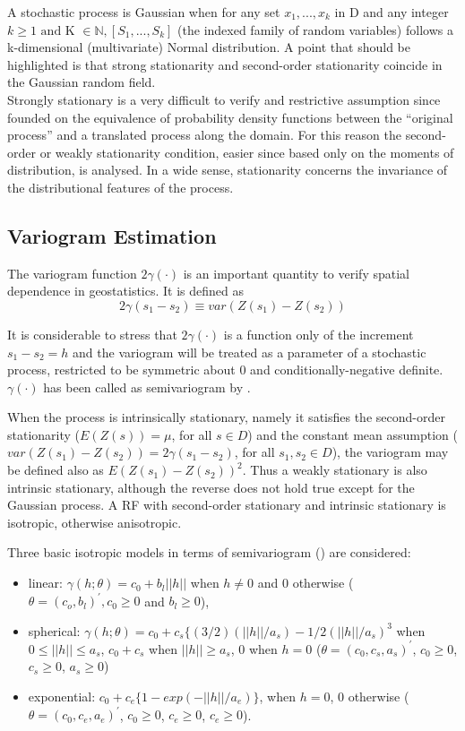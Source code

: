 \documentclass[
  12pt]{article}
\providecommand{\tightlist}{%
  \setlength{\itemsep}{0pt}\setlength{\parskip}{0pt}}\usepackage{longtable,booktabs,array}
\begin{document}
A stochastic process is Gaussian when for any set \(x_1,..., x_k\) in D
and any integer
\(k \geq 1 \text{ and K } \in \mathbb{N},[S_1,..., S_k ]\) (the indexed
family of random variables) follows a k-dimensional (multivariate)
Normal distribution. A point that should be highlighted is that strong
stationarity and second-order stationarity coincide in the Gaussian
random field.\\
Strongly stationary is a very difficult to verify and restrictive
assumption since founded on the equivalence of probability density
functions between the ``original process'' and a translated process
along the domain. For this reason the second-order or weakly
stationarity condition, easier since based only on the moments of
distribution, is analysed. In a wide sense, stationarity concerns the
invariance of the distributional features of the process.

\subsection{Variogram Estimation}\label{variogram-estimation}

The variogram function \(2\gamma(\cdot)\) is an important quantity to
verify spatial dependence in geostatistics. It is defined as\\
\[2\gamma(s_1-s_2)\equiv var(Z(s_1)-Z(s_2))\]

It is considerable to stress that \(2\gamma(\cdot)\) is a function only
of the increment \(s_1 - s_2=h\) and the variogram will be treated as a
parameter of a stochastic process, restricted to be symmetric about 0
and conditionally-negative definite. \(\gamma(\cdot)\) has been called
as semivariogram by \citet{mat:1962}.

When the process is intrinsically stationary, namely it satisfies the
second-order stationarity (\(E(Z(s))=\mu\), for all \(s\in D\)) and the
constant mean assumption (\(var(Z(s_1)-Z(s_2))=2\gamma(s_1-s_2)\), for
all \(s_1,s_2 \in D\)), the variogram may be defined also as
\(E(Z(s_1)-Z(s_2))^2\). Thus a weakly stationary is also intrinsic
stationary, although the reverse does not hold true except for the
Gaussian process. A RF with second-order stationary and intrinsic
stationary is isotropic, otherwise anisotropic.

Three basic isotropic models in terms of semivariogram (\citet{ag:1978})
are considered:

\begin{itemize}
\tightlist
\item
  linear: \(\gamma(h;\theta)=c_0+b_l||h||\) when \(h \neq 0\) and \(0\)
  otherwise (\(\theta=(c_o,b_l)^{\prime}, c_0 \geq 0\) and
  \(b_l \geq 0\)),
\item
  spherical:
  \(\gamma(h;\theta)=c_0+c_s\{(3/2)(||h||/a_{s})-1/2(||h||/a_{s})^3\)
  when \(0\leq ||h|| \leq a_s\), \(c_0+c_s\) when \(||h|| \geq a_s\),
  \(0\) when \(h=0\) (\(\theta=(c_0, c_s, a_s)^{\prime}\),
  \(c_0 \geq0\), \(c_s \geq 0\), \(a_s \geq 0\))
\item
  exponential: \(c_0+c_e\{1-exp(-||h||/a_{e})\}\), when \(h=0\), \(0\)
  otherwise (\(\theta=(c_0,c_e,a_e)^{\prime}\), \(c_0 \geq 0\),
  \(c_e \geq 0\), \(c_e \geq 0\)).
\end{itemize}
\end{document}
